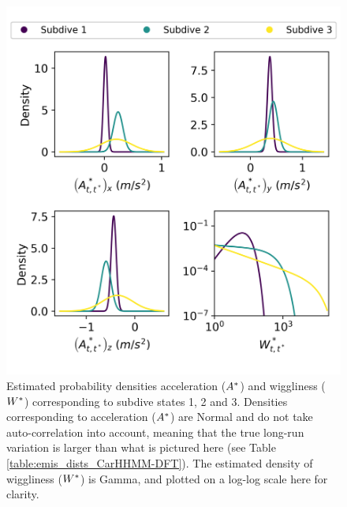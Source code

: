 \begin{figure}[ht]
	\centering
	\includegraphics[width=5in]{../Plots/CarHHMM2-fine-emissions.png}
	\caption{Estimated probability densities acceleration ($A^*$) and wiggliness ($W^*$) corresponding to subdive states 1, 2 and 3. Densities corresponding to acceleration ($A^*$) are Normal and do not take auto-correlation into account, meaning that the true long-run variation is larger than what is pictured here (see Table \ref{table:emis_dists_CarHHMM-DFT}). The estimated density of wiggliness ($W^*$) is Gamma, and plotted on a log-log scale here for clarity.}
	\label{fig:fine_emis}
\end{figure}

